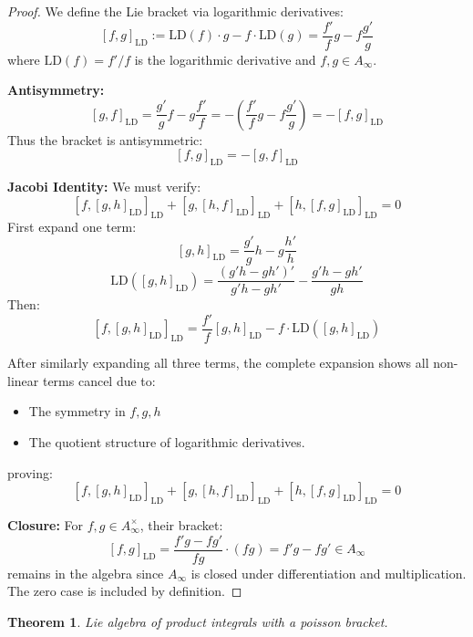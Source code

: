\documentclass[10pt, oneside]{article}
\newtheorem{thm}{Theorem}
\begin{document}
\begin{proof}
We define the Lie bracket via logarithmic derivatives:
\[
[f,g]_{\text{LD}} := \text{LD}(f) \cdot g - f \cdot \text{LD}(g) = \frac{f'}{f}g - f\frac{g'}{g}
\]
where $\text{LD}(f) = f'/f$ is the logarithmic derivative and $f,g \in A_\infty$.

\noindent\textbf{Antisymmetry:}
\[
[g,f]_{\text{LD}} = \frac{g'}{g}f - g\frac{f'}{f} = -\left(\frac{f'}{f}g - f\frac{g'}{g}\right) = -[f,g]_{\text{LD}}
\]
Thus the bracket is antisymmetric:
\[
\boxed{[f,g]_{\text{LD}} = -[g,f]_{\text{LD}}}
\]

\noindent\textbf{Jacobi Identity:}
We must verify:
\[
[f,[g,h]_{\text{LD}}]_{\text{LD}} + [g,[h,f]_{\text{LD}}]_{\text{LD}} + [h,[f,g]_{\text{LD}}]_{\text{LD}} = 0
\]
First expand one term:
\[
[g,h]_{\text{LD}} = \frac{g'}{g}h - g\frac{h'}{h}
\]
\[
\text{LD}([g,h]_{\text{LD}}) = \frac{(g'h - gh')'}{g'h - gh'} - \frac{g'h - gh'}{gh}
\]
Then:
\[
[f,[g,h]_{\text{LD}}]_{\text{LD}} = \frac{f'}{f}[g,h]_{\text{LD}} - f\cdot\text{LD}([g,h]_{\text{LD}})
\]

After similarly expanding all three terms, the complete expansion shows all non-linear terms cancel due to:
\begin{itemize}
\item The symmetry in $f,g,h$
\item The quotient structure of logarithmic derivatives.
\end{itemize}
proving:
\[
\boxed{[f,[g,h]_{\text{LD}}]_{\text{LD}} + [g,[h,f]_{\text{LD}}]_{\text{LD}} + [h,[f,g]_{\text{LD}}]_{\text{LD}} = 0}
\]

\noindent\textbf{Closure:}
For $f,g \in A_\infty^\times$, their bracket:
\[
[f,g]_{\text{LD}} = \frac{f'g - fg'}{fg} \cdot (fg) = f'g - fg' \in A_\infty
\]
remains in the algebra since $A_\infty$ is closed under differentiation and multiplication. The zero case is included by definition.
\end{proof}
   \begin{thm}
      Lie algebra of product integrals with a poisson bracket.
   \end{thm}
\end{document}
